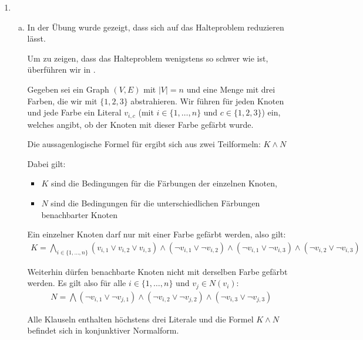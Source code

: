\begin{enumerate}
  \item
    \begin{enumerate}[(a)]
      \item In der Übung wurde gezeigt, dass sich \DreiSAT{} auf das
        Halteproblem reduzieren lässt.

        Um zu zeigen, dass das Halteproblem wenigstens so schwer wie
        \COLORDrei{} ist, überführen wir \COLORDrei{} in \DreiSAT{}.

        Gegeben sei ein Graph $(V, E)$ mit $|V| = n$ und eine Menge mit drei
        Farben, die wir mit $\{1,2,3\}$ abstrahieren. Wir führen für jeden
        Knoten und jede Farbe ein Literal $v_{i, c}$ (mit $i \in \{1, \ldots,
        n\}$ und $c \in \{1,2,3\}$) ein, welches angibt, ob der Knoten mit
        dieser Farbe gefärbt wurde.

        Die aussagenlogische Formel für \DreiSAT{} ergibt sich aus zwei
        Teilformeln: $K \wedge N$

        Dabei gilt:
        \begin{itemize}
          \item $K$ sind die Bedingungen für die Färbungen der einzelnen Knoten,
          \item $N$ sind die Bedingungen für die unterschiedlichen Färbungen
            benachbarter Knoten
        \end{itemize}

        Ein einzelner Knoten darf nur mit einer Farbe gefärbt werden, also gilt:
        \begin{align*}
          K = \bigwedge\limits_{i \in \{1, \ldots, n\}}
            (v_{i, 1} \vee v_{i, 2} \vee v_{i, 3}) \wedge
            (\neg v_{i, 1} \vee \neg v_{i, 2}) \wedge
            (\neg v_{i, 1} \vee \neg v_{i, 3}) \wedge
            (\neg v_{i, 2} \vee \neg v_{i, 3})
        \end{align*}

        Weiterhin dürfen benachbarte Knoten nicht mit derselben Farbe gefärbt
        werden. Es gilt also für alle $i \in \{1, \ldots, n\}$ und
        $v_j \in N(v_i)$:
        \begin{align*}
          N = \bigwedge\limits
            (\neg v_{i, 1} \vee \neg v_{j, 1}) \wedge
            (\neg v_{i, 2} \vee \neg v_{j, 2}) \wedge
            (\neg v_{i, 3} \vee \neg v_{j, 3})
        \end{align*}

        Alle Klauseln enthalten höchstens drei Literale und die Formel $K \wedge
        N$ befindet sich in konjunktiver Normalform.


\end{enumerate}
\end{enumerate}
